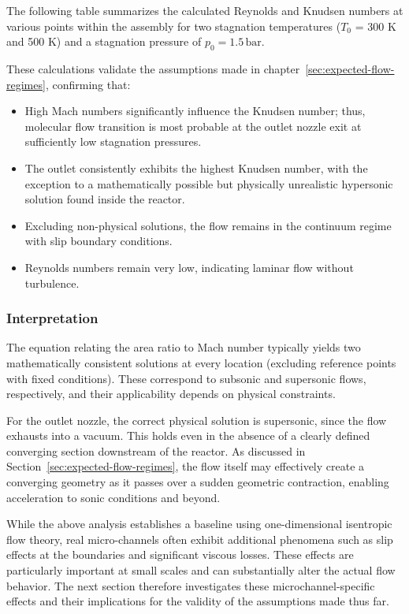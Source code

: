 	The following table summarizes the calculated Reynolds and Knudsen numbers at various points within the assembly for two stagnation temperatures ($T_0$ = 300 K and 500 K) and a stagnation pressure of $p_0 = 1.5\,\text{bar}$.

	

	\newpage
	These calculations validate the assumptions made in chapter~\ref{sec:expected-flow-regimes}, confirming that:
	\begin{itemize}
	    \item High Mach numbers significantly influence the Knudsen number; thus, molecular flow transition is most probable at the outlet nozzle exit at sufficiently low stagnation pressures.
	    \item The outlet consistently exhibits the highest Knudsen number, with the exception to a mathematically possible but physically unrealistic hypersonic solution found inside the reactor.
	    \item Excluding non-physical solutions, the flow remains in the continuum regime with slip boundary conditions.
	    \item Reynolds numbers remain very low, indicating laminar flow without turbulence.
	\end{itemize}

\subsubsection*{Interpretation}

	The equation relating the area ratio to Mach number typically yields two mathematically consistent solutions at every location (excluding reference points with fixed conditions).
	These correspond to subsonic and supersonic flows, respectively, and their applicability depends on physical constraints.

	For the outlet nozzle, the correct physical solution is supersonic, since the flow exhausts into a vacuum.
	This holds even in the absence of a clearly defined converging section downstream of the reactor.
	As discussed in Section~\ref{sec:expected-flow-regimes}, the flow itself may effectively create a converging geometry as it passes over a sudden geometric contraction, enabling acceleration to sonic conditions and beyond.

	While the above analysis establishes a baseline using one-dimensional isentropic flow theory, real micro-channels often exhibit additional phenomena such as slip effects at the boundaries and significant viscous losses.
	These effects are particularly important at small scales and can substantially alter the actual flow behavior.
	The next section therefore investigates these microchannel-specific effects and their implications for the validity of the assumptions made thus far.
